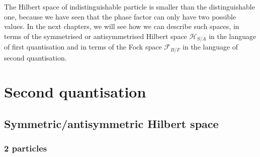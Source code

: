     The Hilbert space of indistinguishable particle is smaller than the distinguishable one, because we have seen that the phase factor can only have two possible values. In the next chapters, we will see how we can describe such spaces, in terms of the symmetrised or antisymmetrised Hilbert space $\mathcal H_{S/A}$ in the language of first quantisation and in terms of the Fock space $\mathcal F_{B/F}$ in the language of second quantisation.

\chapter{Second quantisation}

\section{Symmetric/antisymmetric Hilbert space} 

\subsection{2 particles}

